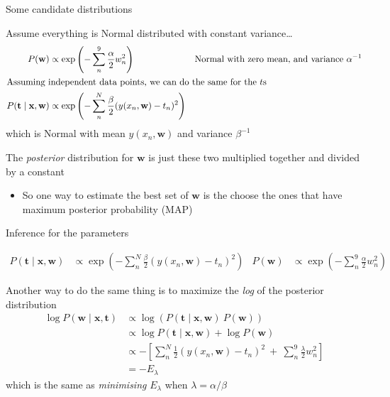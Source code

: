 \documentclass{hertieteaching}
\begin{document}
\begin{frame}{Some candidate distributions}

Assume everything is Normal distributed with constant variance\ldots \pause
\begin{align*}
P(\mathbf{w}) & \propto \exp \left(-\sum^{9}_n \frac{\alpha}{2} w_n^2\right) & \text{Normal with zero mean, and variance $\alpha^{-1}$} \\
\intertext{Assuming independent data points, we can do the same for the $t$s}
P(\mathbf{t} \mid \mathbf{x}, \mathbf{w}) &\propto \exp \left( -\sum^{N}_n \frac{\beta}{2} (y(x_n, \mathbf{w})-t_n)^2 \right)
\end{align*}
which is Normal with mean $y(x_n, \mathbf{w})$ and variance $\beta^{-1}$

The \textit{posterior} distribution for $\mathbf{w}$ is just these two multiplied together and divided by a constant
\begin{itemize}
  \item So one way to estimate the best set of $\mathbf{w}$ is the choose the ones that have maximum posterior probability (MAP)
\end{itemize}

\end{frame}
\begin{frame}{Inference for the parameters}

\begin{align*}
P(\mathbf{t} \mid \mathbf{x}, \mathbf{w}) &\propto \exp \left( -\sum^{N}_n \frac{\beta}{2} (y(x_n, \mathbf{w})-t_n)^2 \right) &
P(\mathbf{w}) & \propto \exp \left(-\sum^{9}_n \frac{\alpha}{2} w_n^2\right) 
\end{align*}

Another way to do the same thing is to maximize the \textit{log} of the posterior distribution
\begin{align*}
\log P(\mathbf{w} \mid \mathbf{x}, \mathbf{t}) &\propto \log \left(P(\mathbf{t} \mid \mathbf{x}, \mathbf{w})~P(\mathbf{w})\right) \\
      &\propto  \log P(\mathbf{t} \mid \mathbf{x}, \mathbf{w}) + \log P(\mathbf{w})\\
      & \propto -\left[ \sum^{N}_n \frac{1}{2} (y(x_n, \mathbf{w})-t_n)^2 ~+~ \sum^{9}_n \frac{\lambda}{2} w_n^2 \right]\\
      & = -E_\lambda
\end{align*}
which is the same as \textit{minimising} $E_\lambda$ when $\lambda  = \alpha/\beta$

\end{frame}
\end{document}
